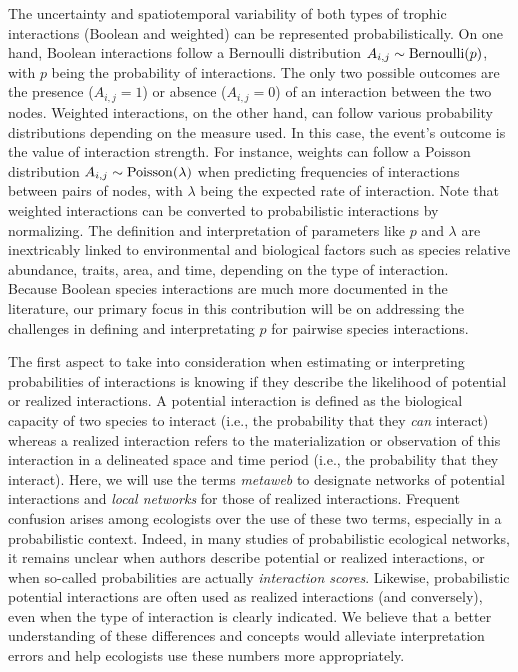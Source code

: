 \documentclass[10pt,oneside]{article}
\begin{document}
The uncertainty and spatiotemporal variability of both types of trophic
interactions (Boolean and weighted) can be represented
probabilistically. On one hand, Boolean interactions follow a Bernoulli
distribution \(A_{i,j} \sim {\rm Bernoulli}(p)\), with \(p\) being the
probability of interactions. The only two possible outcomes are the
presence (\(A_{i,j} = 1\)) or absence (\(A_{i,j} = 0\)) of an
interaction between the two nodes. Weighted interactions, on the other
hand, can follow various probability distributions depending on the
measure used. In this case, the event's outcome is the value of
interaction strength. For instance, weights can follow a Poisson
distribution \(A_{i,j} \sim {\rm Poisson}(\lambda)\) when predicting
frequencies of interactions between pairs of nodes, with \(\lambda\)
being the expected rate of interaction. Note that weighted interactions
can be converted to probabilistic interactions by normalizing. The
definition and interpretation of parameters like \(p\) and \(\lambda\)
are inextricably linked to environmental and biological factors such as
species relative abundance, traits, area, and time, depending on the
type of interaction.\\
Because Boolean species interactions are much more documented in the
literature, our primary focus in this contribution will be on addressing
the challenges in defining and interpretating \(p\) for pairwise species
interactions.

The first aspect to take into consideration when estimating or
interpreting probabilities of interactions is knowing if they describe
the likelihood of potential or realized interactions. A potential
interaction is defined as the biological capacity of two species to
interact (i.e., the probability that they \emph{can} interact) whereas a
realized interaction refers to the materialization or observation of
this interaction in a delineated space and time period (i.e., the
probability that they interact). Here, we will use the terms
\emph{metaweb} to designate networks of potential interactions and
\emph{local networks} for those of realized interactions. Frequent
confusion arises among ecologists over the use of these two terms,
especially in a probabilistic context. Indeed, in many studies of
probabilistic ecological networks, it remains unclear when authors
describe potential or realized interactions, or when so-called
probabilities are actually \emph{interaction scores}. Likewise,
probabilistic potential interactions are often used as realized
interactions (and conversely), even when the type of interaction is
clearly indicated. We believe that a better understanding of these
differences and concepts would alleviate interpretation errors and help
ecologists use these numbers more appropriately.
\end{document}
